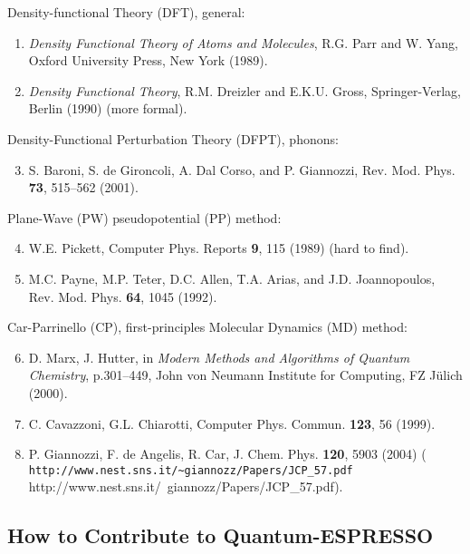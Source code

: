 \documentclass[12pt,a4paper]{article}
\begin{document}
\noindent
Density-functional Theory (DFT), general:
\begin{enumerate}
  \item
    \emph{Density Functional Theory of Atoms and Molecules}, 
    R.G. Parr and W. Yang,
    Oxford University Press, New York (1989).
  \item
    \emph{Density Functional Theory},
    R.M. Dreizler and E.K.U. Gross,
    Springer-Verlag, Berlin (1990) (more formal).
\end{enumerate}
Density-Functional Perturbation Theory (DFPT), phonons:
\begin{enumerate}
  \setcounter{enumi}{2}
  \item
    S. Baroni, S. de Gironcoli, A. Dal Corso, and P. Giannozzi,
    Rev. Mod. Phys. \textbf{73}, 515--562 (2001).
\end{enumerate}
Plane-Wave (PW) pseudopotential (PP) method:
\begin{enumerate}
  \setcounter{enumi}{3}
  \item
    W.E. Pickett,
    Computer Phys. Reports \textbf{9}, 115 (1989)
    (hard to find).
  \item
    M.C. Payne, M.P. Teter, D.C. Allen, T.A. Arias, and
    J.D. Joannopoulos,
    Rev. Mod. Phys. \textbf{64}, 1045 (1992).
\end{enumerate}
Car-Parrinello (CP), first-principles Molecular Dynamics (MD) method:
\begin{enumerate}
  \setcounter{enumi}{5}
  \item
    D. Marx, J. Hutter,
    in \emph{Modern Methods and Algorithms of Quantum Chemistry},
    p.301--449,
    John von Neumann Institute for Computing, FZ J\"ulich (2000).
  \item
    C. Cavazzoni, G.L. Chiarotti,
    Computer Phys. Commun. \textbf{123}, 56 (1999).
  \item
    P. Giannozzi, F. de Angelis, R. Car,
    J. Chem. Phys. \textbf{120}, 5903 (2004)
    (\htmladdnormallink%
     {\texttt{http://www.nest.sns.it/\~{}giannozz/Papers/JCP\_57.pdf}}%
     {http://www.nest.sns.it/~giannozz/Papers/JCP_57.pdf}).
\end{enumerate}

\subsection{How to Contribute to Quantum-ESPRESSO}
\end{document}
